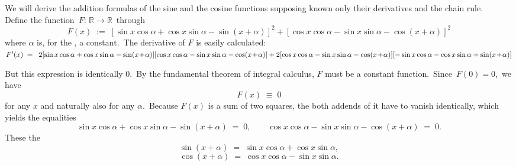 \documentclass[12pt]{article}
\theoremstyle{definition}
\begin{document}
We will derive the addition formulas of the sine and the cosine functions supposing known only their derivatives and the chain rule.\\

Define the function \,$F:\,\mathbb{R} \to \mathbb{R}$\, through
$$F(x) \;:=\; 
[\sin{x}\cos\alpha+\cos{x}\sin\alpha-\sin(x\!+\!\alpha)]^2+[\cos{x}\cos\alpha-\sin{x}\sin\alpha-\cos(x\!+\!\alpha)]^2$$
where $\alpha$ is, for the , a constant.\, The derivative of $F$ is easily calculated:\\
$F'(x) \;=\;\\
\mbox{\;\;}2[\sin{x}\cos\alpha+\cos{x}\sin\alpha-\sin(x\!+\!\alpha)][\cos{x}\cos\alpha-\sin{x}\sin\alpha-\cos(x\!+\!\alpha)]\\
+2[\cos{x}\cos\alpha-\sin{x}\sin\alpha-\cos(x\!+\!\alpha)][-\sin{x}\cos\alpha-\cos{x}\sin\alpha+\sin(x\!+\!\alpha)]$


But this expression is identically 0.\, By the fundamental theorem of integral calculus, $F$ must be a constant function.\, Since\, $F(0) = 0$,\, we have
$$F(x) \;\equiv\; 0$$
for any $x$ and naturally also for any $\alpha$.\, Because $F(x)$ is a sum of two squares, the both addends of it have to vanish identically, which yields the equalities
$$\sin{x}\cos\alpha+\cos{x}\sin\alpha-\sin(x\!+\!\alpha) \;=\; 0, \qquad
  \cos{x}\cos\alpha-\sin{x}\sin\alpha-\cos(x\!+\!\alpha) \;=\; 0.$$
These  the 
$$\sin(x\!+\!\alpha) \;=\; \sin{x}\cos\alpha+\cos{x}\sin\alpha,$$
$$\cos(x\!+\!\alpha) \;=\; \cos{x}\cos\alpha-\sin{x}\sin\alpha.$$

\end{document}
